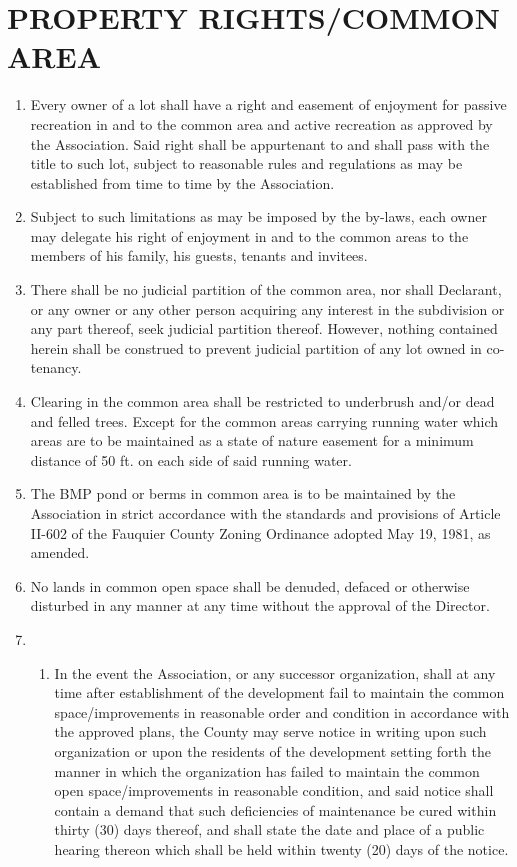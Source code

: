 \documentclass[12pt, letterpaper]{article}
\begin{document}
\section{PROPERTY RIGHTS/COMMON AREA}
\begin{enumerate}
\item Every owner of a lot shall have a right and easement of enjoyment for passive recreation in and to the common area and active recreation as approved by the Association.
Said right shall be appurtenant to and shall pass with the title to such lot, subject to reasonable rules and regulations as may be established from time to time by the Association.
\item Subject to such limitations as may be imposed by the by-laws, each owner may delegate his right of enjoyment in and to the common areas to the members of his family, his guests, tenants and invitees.
\item There shall be no judicial partition of the common area, nor shall Declarant, or any owner or any other person acquiring any interest in the subdivision or any part thereof, seek judicial partition thereof.
However, nothing contained herein shall be construed to prevent judicial partition of any lot owned in co-tenancy.
\item Clearing in the common area shall be restricted to underbrush and/or dead and felled trees.
Except for the common areas carrying running water which areas are to be maintained as a state of nature easement for a minimum distance of 50 ft. on each side of said running water.
\item The BMP pond or berms in common area is to be maintained by the Association in strict accordance with the standards and provisions of Article II-602 of the Fauquier County Zoning Ordinance adopted May 19, 1981, as amended.
\item No lands in common open space shall be denuded, defaced or otherwise disturbed in any manner at any time without the approval of the Director.
\item \begin{enumerate}
 \item In the event the Association, or any successor organization, shall at any time after establishment of the development fail to maintain the common space/improvements in reasonable order and condition in accordance with the approved plans, the County may serve notice in writing upon such organization or upon the residents of the development setting forth the manner in which the organization has failed to maintain the common open space/improvements in reasonable condition, and said notice shall contain a demand that such deficiencies of maintenance be cured within thirty (30) days thereof, and shall state the date and place of a public hearing thereon which shall be held within twenty (20) days of the notice.

\end{enumerate}
\end{enumerate}
\end{document}
